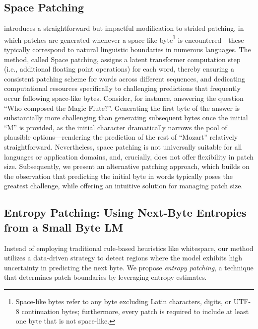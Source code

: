 \subsection{Space Patching}
\label{section:white-patch}

\citet{slagle2024spacebyte} introduces a straightforward but impactful modification to strided patching, in which patches are generated whenever a space-like byte\footnote{
    Space-like bytes refer to any byte excluding Latin characters, digits, or UTF-8 continuation bytes; furthermore, every patch is required to include at least one byte that is not space-like.
} is encountered—these typically correspond to natural linguistic boundaries in numerous languages. The method, called Space patching, assigns a latent transformer computation step (i.e., additional floating point operations) for each word, thereby ensuring a consistent patching scheme for words across different sequences, and dedicating computational resources specifically to challenging predictions that frequently occur following space-like bytes. Consider, for instance, answering the question ``Who composed the Magic Flute?\uline{\hspace{.6em}}''. Generating the first byte of the answer is substantially more challenging than generating subsequent bytes once the initial ``M'' is provided, as the initial character dramatically narrows the pool of plausible options—rendering the prediction of the rest of ``Mozart'' relatively straightforward. Nevertheless, space patching is not universally suitable for all languages or application domains, and, crucially, does not offer flexibility in patch size. Subsequently, we present an alternative patching approach, which builds on the observation that predicting the initial byte in words typically poses the greatest challenge, while offering an intuitive solution for managing patch size.

\subsection{Entropy Patching: Using Next-Byte Entropies from a Small Byte LM}
\label{section:dyn-patch}

Instead of employing traditional rule-based heuristics like whitespace, our method utilizes a data-driven strategy to detect regions where the model exhibits high uncertainty in predicting the next byte. We propose \textit{entropy patching}, a technique that determines patch boundaries by leveraging entropy estimates.

